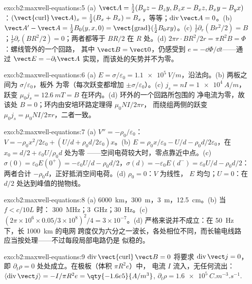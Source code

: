 \begin{solution}{exo:b2:maxwell-equations:5}
(a) $\vect A = \tfrac12(B_yz - B_zy, B_zx - B_xz, B_xy - B_yx)$：$(\operatorname{\vect{curl}}
\vect A)_x = \tfrac12(B_x + B_x) = B_x$，等等；$\operatorname{div}\vect A = 0$。(b)
$\vect A' - \vect A = \tfrac12B_0(y, x, 0) = \operatorname{\vect{grad}}(\tfrac12B_0xy)$。(c)
$\frac1r\partial_r(Br^2/2) = B$；$\frac1r\partial_r(BR^2/2) = 0$；两者都等于 $BR/2$
在 $R$ 处。(d) $2\pi r\cdot BR^2/2r = \pi R^2B = \Phi$：螺线管外的一个回路，
其中 $\vect B = \vect 0$，仍感受到 $e = -\dd\Phi/\dd t$——通过 $\vect E =
-\partial_t\vect A$ 实现，而该处的矢势并不为零。
\end{solution}

\begin{solution}{exo:b2:maxwell-equations:6}
(a) $E = \sigma/\varepsilon_0 = \qty{1.1e5}{V/m}$，沿法向。(b) 两板之间为 $\sigma/\varepsilon_0$，板外
为零（每次跃变都增加 $\pm\sigma/\varepsilon_0$）。(c) $j_s = nI = \qty{1e4}{A/m}$，跃变
$\mu_0j_s = \qty{12.6}{mT} = B$ 在环内。(d) 环外的一个回路所包围的
净电流为零，故该处 $B = 0$；环内由安培环路定理得 $\mu_0NI/2\pi r$，
而绕组两侧的跃变 $\mu_0j_s = \mu_0NI/2\pi r$，二者一致。
\end{solution}

\begin{solution}{exo:b2:maxwell-equations:7}
(a) $V'' = -\rho_0/\varepsilon_0$：$V = -\rho_0x^2/2\varepsilon_0 + (U/d + \rho_0d/2\varepsilon_0)x$。(b)
$E = \rho_0x/\varepsilon_0 - U/d - \rho_0d/2\varepsilon_0$，在 $x_0 = d/2 + \varepsilon_0U/\rho_0d$ 处为零
——空间电荷较大时，零点靠近中点。(c) $\sigma(0) = \varepsilon_0E(0^+) =
-\varepsilon_0U/d - \rho_0d/2$，$\sigma(d) = -\varepsilon_0E(d^-) = \varepsilon_0U/d - \rho_0d/2$：两者合计
$-\rho_0d$，正好抵消空间电荷。(d) $\rho_0 = 0$：$V$ 为线性，
$E$ 均匀；$U = 0$：在 $d/2$ 处达到峰值的抛物线。
\end{solution}

\begin{solution}{exo:b2:maxwell-equations:8}
(a) \qty{6000}{km}，\qty{300}{m}，\qty{3}{m}，\qty{12.5}{cm}。(b) 当 $f < c/10L$ 时：
\qty{300}{MHz}；\qty{3}{GHz}；\qty{30}{Hz}。(c) $(2\pi \times 10^6 \times 0.05/3 \times 10^8)^2/4 =
3 \times 10^{-7}$。(d) 严格来说并不成立：在 \qty{50}{Hz} 下，长 \qty{1000}{km} 的电网
跨度仅为六分之一波长，各处相位不同，而长输电线路
应当按处理——不过每段局部电路仍是
似稳的。
\end{solution}

\begin{solution}{exo:b2:maxwell-equations:9}
$\operatorname{div}\operatorname{\vect{curl}}\vect B = 0$ 将要求 $\operatorname{div}\vect j =
0$，即 $\partial_t\rho = 0$ 处处成立。在极板（体积 $\pi R^2e$）中，
电流 $I$ 流入，无任何流出：$\langle\operatorname{div}\vect j\rangle =
-I/\pi R^2e = \qty{-1.6e5}{A/m^3}$, $\partial_t\rho = \qty{+1.6e5}{C.m^{-3}.s^{-1}}$.
\end{solution}


